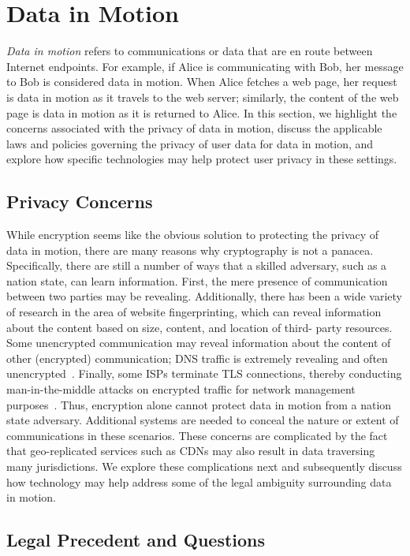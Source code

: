 \section{Data in Motion}
\label{sec:motion}

{\em Data in motion} refers to communications or data that are en route between
Internet endpoints. For example, if Alice is communicating with Bob, her
message to Bob is considered data in motion.  When Alice fetches a web page,
her request is data in motion as it travels to the web server; similarly, the
content of the web page is data in motion as it is returned to Alice. In this
section, we highlight the concerns associated with the privacy of data in
motion, discuss the applicable laws and policies governing the privacy of user
data for data in motion, and explore how specific technologies may help protect
user privacy in these settings.

\subsection{Privacy Concerns}

While encryption seems like the obvious solution to protecting the privacy of
data in motion, there are many reasons why cryptography is not a panacea.
Specifically, there are still a number of ways that a skilled adversary, such
as a nation state, can learn information.  First, the mere presence of
communication between two parties may be revealing.  Additionally, there has
been a wide variety of research in the area of website fingerprinting, which
can reveal information about the content based on size, content, and location
of third- party resources.  Some unencrypted communication may reveal
information about the content of other (encrypted) communication; DNS traffic
is extremely revealing and often unencrypted~\cite{isps_see}.  Finally, some
ISPs terminate TLS connections, thereby conducting man-in-the-middle attacks
on encrypted traffic for network management purposes~\cite{gogo}. Thus,
encryption alone cannot protect data in motion from a nation state adversary.
Additional systems are needed to conceal the nature or extent of
communications in these scenarios. These concerns are complicated by the fact
that geo-replicated services such as CDNs may also result in data traversing
many jurisdictions.  We explore these complications next and subsequently
discuss how technology may help address some of the legal ambiguity
surrounding data in motion.

\subsection{Legal Precedent and Questions}

